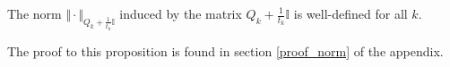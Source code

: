 \begin{proposition}
\label{prop_norm}
	The norm \(\Vert \cdot \Vert_{Q_k+\frac{1}{t_k}\mathbb{I}}\) induced by the matrix \(Q_k+\frac{1}{t_k}\mathbb{I}\) is well-defined for all \(k\).
\end{proposition}

The proof to this proposition is found in section \ref{proof_norm} of the appendix.

%

